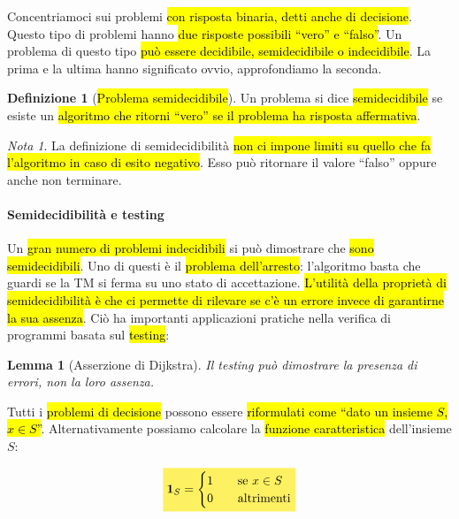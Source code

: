 \documentclass[a4paper,11pt,oneside]{article}
\theoremstyle{plain}
\newtheorem{lem}{Lemma}[section]
\theoremstyle{definition}
\newtheorem{defn}{Definizione}[section]
\theoremstyle{remark}
\newtheorem*{nota}{Nota}
\newcommand{\mhl}[1]{\colorbox{hlcolor}{$\displaystyle #1$}}
\begin{document}
Concentriamoci sui problemi \hl{con risposta binaria, detti anche di decisione}.
Questo tipo di problemi hanno \hl{due risposte possibili ``vero'' e ``falso''}.
Un problema di questo tipo \hl{può essere decidibile, semidecidibile o
indecidibile}. La prima e la ultima hanno significato ovvio, approfondiamo la
seconda.

\begin{defn}[\hl{Problema semidecidibile}]\label{def:problema-semidecidibile}
  Un problema si dice \hl{semidecidibile} se esiste un \hl{algoritmo che ritorni
  ``vero'' se il problema ha risposta affermativa}.
\end{defn}

\begin{nota}
  La definizione di semidecidibilità \hl{non ci impone limiti su quello che fa
  l'algoritmo in caso di esito negativo}. Esso può ritornare il valore ``falso''
  oppure anche non terminare.
\end{nota}

\paragraph{Semidecidibilità e testing} Un \hl{gran numero di problemi
indecidibili} si può dimostrare che \hl{sono semidecidibili}. Uno di questi è il
\hl{problema dell'arresto}: l'algoritmo basta che guardi se la TM si ferma su
uno stato di accettazione. \hl{L'utilità della proprietà di semidecidibilità è
che ci permette di rilevare se c'è un errore invece di garantirne la sua
assenza}. Ciò ha importanti applicazioni pratiche nella verifica di programmi
basata sul \hl{testing}:

\begin{lem}[Asserzione di Dijkstra]
  Il testing può dimostrare la presenza di errori, non la loro assenza.
\end{lem}

Tutti i \hl{problemi di decisione} possono essere \hl{riformulati come ``dato un
insieme $S$, $x \in S$''}. Alternativamente possiamo calcolare la \hl{funzione
caratteristica} dell'insieme $S$:

\begin{equation}
  \mhl{
    \mathbf{1}_{S} =
    \begin{cases}
      1 & \quad \text{se } x \in S \\
      0 & \quad \text{altrimenti}
    \end{cases}
  }
\end{equation}
\end{document}
